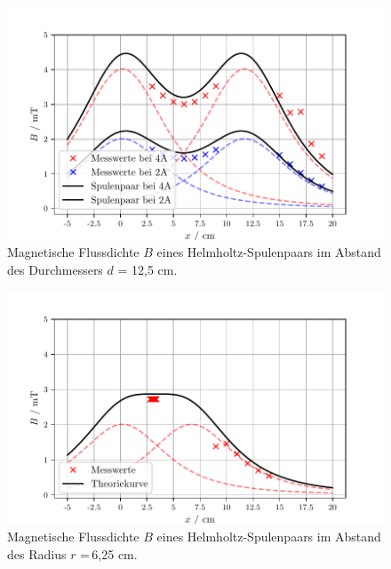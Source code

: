 \begin{figure}
  \centering
  \includegraphics{helmholtzD.pdf}
  \caption{Magnetische Flussdichte $B$ eines Helmholtz-Spulenpaars im Abstand des Durchmessers $d$ = 12,5 cm.}
  \label{fig:plot}
\end{figure}

\begin{figure}
  \centering
  \includegraphics{helmholtzR.pdf}
  \caption{Magnetische Flussdichte $B$ eines Helmholtz-Spulenpaars im Abstand des Radius $r$ =\,6,25 cm.}
  \label{fig:plot}
\end{figure}



